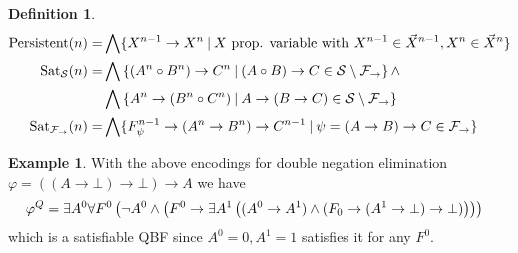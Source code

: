 \documentclass[a4paper,12pt]{report}
\theoremstyle{definition}
\theoremstyle{definition}
\theoremstyle{definition}
\theoremstyle{definition}
\theoremstyle{definition}
\newtheorem{definition}[theorem]{Definition}
\theoremstyle{definition}
\newtheorem{example}[theorem]{Example}
\theoremstyle{definition}
\begin{document}
\begin{definition}
\begin{align*}
			\text{\normalfont Persistent}(n) = & \bigwedge\{X^{n-1}\to X^n\:|\: X \text{ prop. variable with }X^{n-1}\in\vec X^{n-1}, X^n \in\vec X^{n}\}\\
			\text{\normalfont Sat}_{\mathcal S}(n) = &\bigwedge\left\{(A^n\circ B^n)\to C^n\:|\:(A\circ B)\to C\in \mathcal S\setminus\mathcal F_\to\right\}\wedge\\
			&\bigwedge\left\{A^n\to (B^n\circ C^n)\:|\:A\to (B\to C)\in \mathcal S\setminus\mathcal F_\to\right\}\\
			\text{\normalfont Sat}_{\mathcal F_\to}(n) = & \bigwedge\{F^{n-1}_\psi\to (A^n\to B^n)\to C^{n-1}\:|\:\psi = (A\to B)\to C\in\mathcal F_\to\}
		\end{align*}
	\end{definition}
	
	\begin{example}
		With the above encodings for double negation elimination $\varphi = ((A\to \bot)\to \bot)\to A$ we have
		$$\hspace*{-.3cm}
		\varphi^Q = \exists A^0\forall F^0\left(\neg A^0\wedge\left(F^0\to \exists A^1\left((A^0\to A^1)\wedge(F_0\to (A^1\to \bot)\to \bot)\right)\right)\right)
		$$
		which is a satisfiable QBF since $A^0 = 0, A^1 = 1$ satisfies it for any $F^0$.
	\end{example}
	
\end{document}

